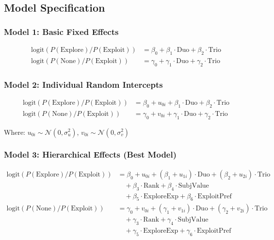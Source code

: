 \documentclass[11pt,a4paper]{article}
\begin{document}
\subsection{Model Specification}

\subsubsection{Model 1: Basic Fixed Effects}
\begin{align}
\text{logit}(P(\text{Explore})/P(\text{Exploit})) &= \beta_0 + \beta_1 \cdot \text{Duo} + \beta_2 \cdot \text{Trio}\\
\text{logit}(P(\text{None})/P(\text{Exploit})) &= \gamma_0 + \gamma_1 \cdot \text{Duo} + \gamma_2 \cdot \text{Trio}
\end{align}

\subsubsection{Model 2: Individual Random Intercepts}
\begin{align}
\text{logit}(P(\text{Explore})/P(\text{Exploit})) &= \beta_0 + u_{0i} + \beta_1 \cdot \text{Duo} + \beta_2 \cdot \text{Trio}\\
\text{logit}(P(\text{None})/P(\text{Exploit})) &= \gamma_0 + v_{0i} + \gamma_1 \cdot \text{Duo} + \gamma_2 \cdot \text{Trio}
\end{align}

Where: $u_{0i} \sim \mathcal{N}(0, \sigma_u^2)$, $v_{0i} \sim \mathcal{N}(0, \sigma_v^2)$

\subsubsection{Model 3: Hierarchical Effects (Best Model)}
\begin{align}
\text{logit}(P(\text{Explore})/P(\text{Exploit})) &= \beta_0 + u_{0i} + (\beta_1 + u_{1i}) \cdot \text{Duo} + (\beta_2 + u_{2i}) \cdot \text{Trio} \nonumber\\
&\quad + \beta_3 \cdot \text{Rank} + \beta_4 \cdot \text{SubjValue} \nonumber\\
&\quad + \beta_5 \cdot \text{ExploreExp} + \beta_6 \cdot \text{ExploitPref}\\
\text{logit}(P(\text{None})/P(\text{Exploit})) &= \gamma_0 + v_{0i} + (\gamma_1 + v_{1i}) \cdot \text{Duo} + (\gamma_2 + v_{2i}) \cdot \text{Trio} \nonumber\\
&\quad + \gamma_3 \cdot \text{Rank} + \gamma_4 \cdot \text{SubjValue} \nonumber\\
&\quad + \gamma_5 \cdot \text{ExploreExp} + \gamma_6 \cdot \text{ExploitPref}
\end{align}
\end{document}
